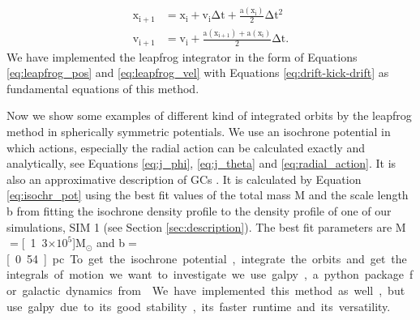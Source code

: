 \begin{align}
\mathrm{x_{i+1}} &= \mathrm{x_i+v_i\Delta t+\frac{a(x_i)}{2}\Delta t^2} \label{eq:leapfrog_pos}\\
\mathrm{v_{i+1}} &= \mathrm{v_i+\frac{a(x_{i+1})+a(x_i)}{2}\Delta t}.\label{eq:leapfrog_vel}
\end{align}
We have implemented the leapfrog integrator in the form of Equations \eqref{eq:leapfrog_pos} and \eqref{eq:leapfrog_vel} with Equations \eqref{eq:drift-kick-drift} as fundamental equations of this method.

\par Now we show some examples of different kind of integrated orbits by the leapfrog method in spherically symmetric potentials. We use an isochrone potential in which actions, especially the radial action can be calculated exactly and analytically, see Equations \eqref{eq:j_phi}, \eqref{eq:j_theta} and \eqref{eq:radial_action}. It is also an approximative description of \acp{GC} \citep{2014arXiv1411.4937B}. It is calculated by Equation \eqref{eq:isochr_pot} using the best fit values of the total mass M and the scale length b from fitting the isochrone density profile to the density profile of one of our simulations, SIM 1 (see Section \ref{sec:description}). The best fit parameters are M$=$\unit[1.3$\times10^5$]{M$_\odot$} and b$=$\unit[0.54]{pc}. To get the isochrone potential, integrate the orbits and get the integrals of motion we want to investigate we use galpy, a python package for galactic dynamics from \citealp{2015ApJS..216...29B}. We have implemented this method as well, but use galpy due to its good stability, its faster runtime and its versatility.


